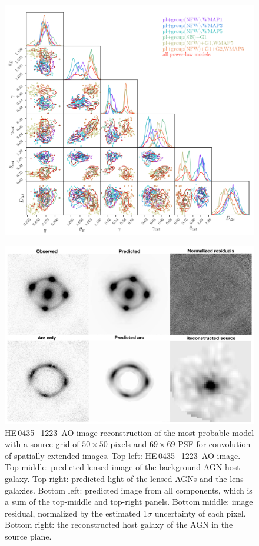 \documentclass[useAMS,usenatbib]{mnras}
\newcommand\he{HE\,0435$-$1223}
\newcommand\pg{PG\,1115$+$080}
\begin{document}
\begin{figure}
\centering
\includegraphics[scale=0.6]{PG1115_powerlaw.png}
\caption{}
\label{fig:PG_pl}
\end{figure}

\begin{figure}
\centering
\includegraphics[scale=0.6]{HE0435_AO_image.png}
\caption{\he~AO image reconstruction of the most probable model with a source grid of $50 \times 50$ pixels and $69 \times 69$ PSF for convolution of spatially extended images. Top left: \he~AO image. Top middle: predicted lensed image of the background AGN host galaxy. Top right: predicted light of the lensed AGNs and the lens galaxies. Bottom left: predicted image from all components, which is a sum of the top-middle and top-right panels. Bottom middle: image residual, normalized by the estimated 1$\sigma$ uncertainty of each pixel. Bottom right: the reconstructed host galaxy of the AGN in the source plane.}
\label{fig:HE0435_figure}
\end{figure}
\end{document}
